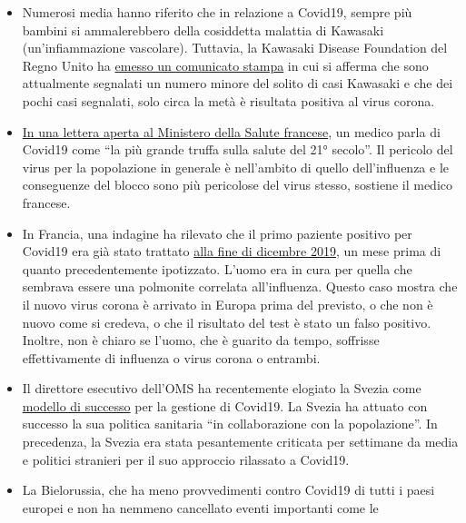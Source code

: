 \begin{itemize}
\tightlist
\item
  Numerosi media hanno riferito che in relazione a Covid19, sempre più
  bambini si ammalerebbero della cosiddetta malattia di Kawasaki
  (un'infiammazione vascolare). Tuttavia, la Kawasaki Disease Foundation
  del Regno Unito ha
  \href{https://www.societi.org.uk/kawasaki-disease-and-covid-19/}{emesso
  un comunicato stampa} in cui si afferma che sono attualmente segnalati
  un numero minore del solito di casi Kawasaki e che dei pochi casi
  segnalati, solo circa la metà è risultata positiva al virus corona.
\item
  \href{https://covidinfos.net/covid19/la-lettre-dun-praticien-hospitalier-adressee-au-ministere-de-la-sante-denonce-une-arnaque-sanitaire/604/}{In
  una lettera aperta al Ministero della Salute francese}, un medico
  parla di Covid19 come ``la più grande truffa sulla salute del 21°
  secolo''. Il pericolo del virus per la popolazione in generale è
  nell'ambito di quello dell'influenza e le conseguenze del blocco sono
  più pericolose del virus stesso, sostiene il medico francese.
\item
  In Francia, una indagine ha rilevato che il primo paziente positivo
  per Covid19 era già stato trattato
  \href{https://www.reuters.com/article/us-health-coronavirus-france-retests/frances-early-covid-19-case-may-hold-clues-to-pandemics-start-idUSKBN22H15R}{alla
  fine di dicembre 2019}, un mese prima di quanto precedentemente
  ipotizzato. L'uomo era in cura per quella che sembrava essere una
  polmonite correlata all'influenza. Questo caso mostra che il nuovo
  virus corona è arrivato in Europa prima del previsto, o che non è
  nuovo come si credeva, o che il risultato del test è stato un falso
  positivo. Inoltre, non è chiaro se l'uomo, che è guarito da tempo,
  soffrisse effettivamente di influenza o virus corona o entrambi.
\item
  Il direttore esecutivo dell'OMS ha recentemente elogiato la Svezia
  come
  \href{https://nypost.com/2020/04/29/who-lauds-sweden-as-model-for-resisting-coronavirus-lockdown/}{modello
  di successo} per la gestione di Covid19. La Svezia ha attuato con
  successo la sua politica sanitaria ``in collaborazione con la
  popolazione''. In precedenza, la Svezia era stata pesantemente
  criticata per settimane da media e politici stranieri per il suo
  approccio rilassato a Covid19.
\item
  La Bielorussia, che ha meno provvedimenti contro Covid19 di tutti i
  paesi europei e non ha nemmeno cancellato eventi importanti come le

\end{itemize}
